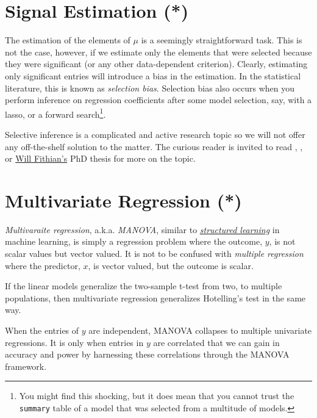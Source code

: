 \documentclass[]{book}
\theoremstyle{definition}
\theoremstyle{definition}
\theoremstyle{definition}
\theoremstyle{remark}
\begin{document}
\section{Signal Estimation (*)}\label{signal-estimation}

The estimation of the elements of \(\mu\) is a seemingly straightforward
task. This is not the case, however, if we estimate only the elements
that were selected because they were significant (or any other
data-dependent criterion). Clearly, estimating only significant entries
will introduce a bias in the estimation. In the statistical literature,
this is known as \emph{selection bias}. Selection bias also occurs when
you perform inference on regression coefficients after some model
selection, say, with a lasso, or a forward search\footnote{You might
  find this shocking, but it does mean that you cannot trust the
  \texttt{summary} table of a model that was selected from a multitude
  of models.}.

Selective inference is a complicated and active research topic so we
will not offer any off-the-shelf solution to the matter. The curious
reader is invited to read \citet{rosenblatt2014selective},
\citet{javanmard2014confidence}, or
\href{http://www.stat.berkeley.edu/~wfithian/}{Will Fithian's} PhD
thesis \citep{fithian2015topics} for more on the topic.

\section{Multivariate Regression (*)}\label{multivariate-regression}

\emph{Multivaraite regression}, a.k.a. \emph{MANOVA}, similar to
\href{https://en.wikipedia.org/wiki/Structured_prediction}{\emph{structured
learning}} in machine learning, is simply a regression problem where the
outcome, \(y\), is not scalar values but vector valued. It is not to be
confused with \emph{multiple regression} where the predictor, \(x\), is
vector valued, but the outcome is scalar.

If the linear models generalize the two-sample t-test from two, to
multiple populations, then multivariate regression generalizes
Hotelling's test in the same way.

When the entries of \(y\) are independent, MANOVA collapses to multiple
univariate regressions. It is only when entries in \(y\) are correlated
that we can gain in accuracy and power by harnessing these correlations
through the MANOVA framework.
\end{document}
